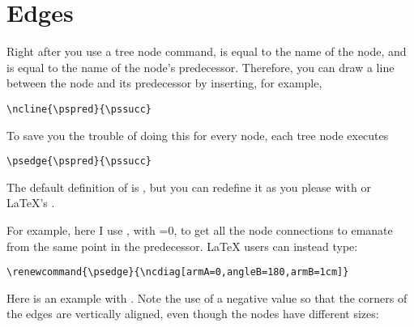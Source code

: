 \documentclass[11pt,english,BCOR10mm,DIV12,bibliography=totoc,parskip=false,smallheadings
    headexclude,footexclude,oneside]{pst-doc}
\begin{document}


\section{Edges}

Right after you use a tree node command,  is equal to the name of the
node, and  is equal to the name of the node's predecessor. Therefore,
you can draw a line between the node and its predecessor by inserting, for
example,

\begin{lstlisting}[style=syntax]
\ncline{\pspred}{\pssucc}
\end{lstlisting}

To save you the trouble of doing this for every node, each tree node executes
\begin{lstlisting}[style=syntax]
  \psedge{\pspred}{\pssucc}
\end{lstlisting}
The default definition of  is , but you can redefine it as
you please with  or \LaTeX's .

For example, here I use , with =0, to get all the node
connections to emanate from the same point in the predecessor. \LaTeX{} users can instead type:
\begin{lstlisting}[style=syntax]
\renewcommand{\psedge}{\ncdiag[armA=0,angleB=180,armB=1cm]}
\end{lstlisting}


\begin{LTXexample}[pos=l,width=0.4\linewidth]
  \def\psedge{\ncdiag[armA=0,angleB=180,armB=1cm]}
\end{LTXexample}

Here is an example with . Note the use of a negative  value
so that the corners of the edges are vertically aligned, even though the nodes
have different sizes:
\end{document}
